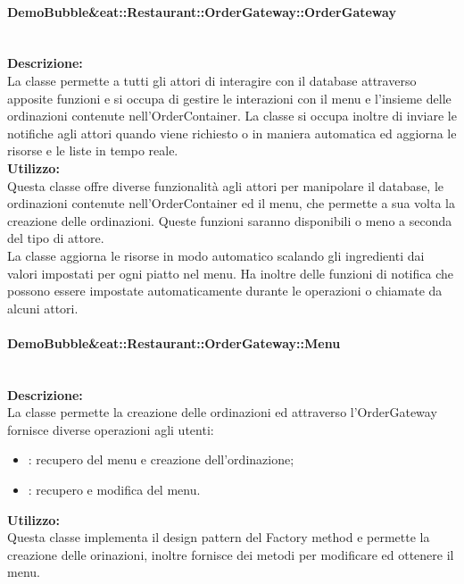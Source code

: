 \paragraph{Demo\-Bubble\&eat\-::Restaurant\-::Order\-Gateway\-::Order\-Gateway}\label{eat-gateway}\mbox{}\\
\textbf{Descrizione:}\\ \nopagebreak
La classe permette a tutti gli attori di interagire con il database attraverso apposite funzioni e si occupa di gestire le interazioni con il menu e l'insieme delle ordinazioni contenute nell'OrderContainer. La classe si occupa inoltre di inviare le notifiche agli attori quando viene richiesto o in maniera automatica ed aggiorna le risorse e le liste in tempo reale.\\
\textbf{Utilizzo:}\\ \nopagebreak
Questa classe offre diverse funzionalità agli attori per manipolare il database, le ordinazioni contenute nell'OrderContainer ed il menu, che permette a sua volta la creazione delle ordinazioni. Queste funzioni saranno disponibili o meno a seconda del tipo di attore.\\
La classe aggiorna le risorse in modo automatico scalando gli ingredienti dai valori impostati per ogni piatto nel menu. Ha inoltre delle funzioni di notifica che possono essere impostate automaticamente durante le operazioni o chiamate da alcuni attori.

\paragraph{Demo\-Bubble\&eat\-::Restaurant\-::Order\-Gateway\-::Menu}\label{eat-menu}\mbox{}\\
\textbf{Descrizione:}\\ \nopagebreak
La classe permette la creazione delle ordinazioni ed attraverso l'Order\-Gateway fornisce diverse operazioni agli utenti:
\begin{itemize}
	\item \Customer{}: recupero del menu e creazione dell'ordinazione;
	\item \Manager{}: recupero e modifica del menu.
\end{itemize}
\textbf{Utilizzo:}\\ \nopagebreak
Questa classe implementa il design pattern del Factory method e permette la creazione delle orinazioni, inoltre fornisce dei metodi per modificare ed ottenere il menu.


